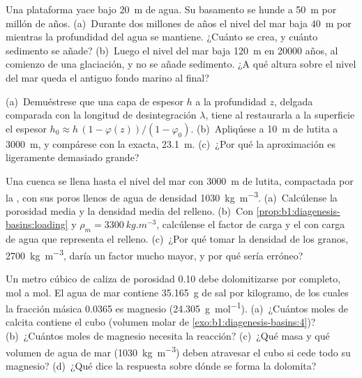 \begin{exercise}[$\star\star$]\label{exo:b1:diagenesis-basins:9}
Una plataforma yace bajo \qty{20}{m} de agua. Su basamento se hunde a \qty{50}{m} por millón de años. (a)~Durante dos millones de años el nivel del mar baja \qty{40}{m} por  mientras la
profundidad del agua se mantiene. ¿Cuánto  se crea, y cuánto sedimento se añade? (b)~Luego el nivel del mar baja \qty{120}{m} en \num{20000} años, al comienzo de una glaciación,
y no se añade sedimento. ¿A qué altura sobre el nivel del mar queda el antiguo fondo marino al final?
\end{exercise}

\begin{exercise}[$\star\star\star$]\label{exo:b1:diagenesis-basins:10}
(a)~Demuéstrese que una capa de espesor $h$ a la profundidad $z$, delgada comparada con la longitud de desintegración $\lambda$, tiene al restaurarla a la superficie el espesor $h_0 \approx h\,(1 - \varphi(z))/(1 -
\varphi_0)$. (b)~Apliqúese a \qty{10}{m} de lutita a \qty{3000}{m}, y compárese con la  exacta, \qty{23.1}{m}. (c)~¿Por qué la aproximación es ligeramente demasiado grande?
\end{exercise}

\begin{exercise}[$\star\star\star$]\label{exo:b1:diagenesis-basins:11}
Una cuenca se llena hasta el nivel del mar con \qty{3000}{m} de lutita, compactada por la , con sus poros llenos de agua de densidad \qty{1030}{kg.m^{-3}}. (a)~Calcúlense la porosidad media y la
densidad media del relleno. (b)~Con \cref{prop:b1:diagenesis-basins:loading} y $\rho_m =
\qty{3300}{kg.m^{-3}}$, calcúlense el factor de carga y el  con carga de agua que representa
el relleno. (c)~¿Por qué tomar la densidad de los granos, \qty{2700}{kg.m^{-3}}, daría un factor mucho mayor, y por qué sería erróneo?
\end{exercise}

\begin{exercise}[$\star\star\star$]\label{exo:b1:diagenesis-basins:12}
Un metro cúbico de caliza de porosidad \num{0.10} debe dolomitizarse por completo, mol a mol. El agua de mar contiene \qty{35.165}{g} de sal por kilogramo, de los cuales la fracción másica \num{0.0365} es
magnesio (\qty{24.305}{g.mol^{-1}}). (a)~¿Cuántos moles de calcita contiene el cubo (volumen molar de \cref{exo:b1:diagenesis-basins:4})? (b)~¿Cuántos moles de magnesio necesita la reacción?
(c)~¿Qué masa y qué volumen de agua de mar (\qty{1030}{kg.m^{-3}}) deben atravesar el cubo si cede todo su magnesio? (d)~¿Qué dice la respuesta sobre dónde se forma la dolomita?
\end{exercise}

